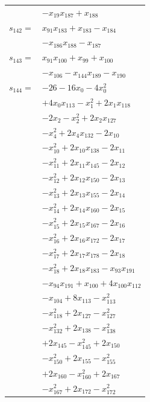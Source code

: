 \begin{longtable}{@{}r@{\;}l@{}}
 & \(\displaystyle -x_{19}x_{187} +x_{188}\) \\[3pt]
\(s_{142}=\) & \(\displaystyle x_{91}x_{183} +x_{183} -x_{184}\) \\
 & \(\displaystyle -x_{186}x_{188} -x_{187}\) \\[3pt]
\(s_{143}=\) & \(\displaystyle x_{91}x_{100} +x_{99} +x_{100}\) \\
 & \(\displaystyle -x_{106} -x_{144}x_{189} -x_{190}\) \\[3pt]
\(s_{144}=\) & \(\displaystyle -26 -16x_{0} -4x_{0}^{2}\) \\
 & \(\displaystyle +4x_{0}x_{113} -x_{1}^{2} +2x_{1}x_{118}\) \\
 & \(\displaystyle -2x_{2} -x_{2}^{2} +2x_{2}x_{127}\) \\
 & \(\displaystyle -x_{4}^{2} +2x_{4}x_{132} -2x_{10}\) \\
 & \(\displaystyle -x_{10}^{2} +2x_{10}x_{138} -2x_{11}\) \\
 & \(\displaystyle -x_{11}^{2} +2x_{11}x_{145} -2x_{12}\) \\
 & \(\displaystyle -x_{12}^{2} +2x_{12}x_{150} -2x_{13}\) \\
 & \(\displaystyle -x_{13}^{2} +2x_{13}x_{155} -2x_{14}\) \\
 & \(\displaystyle -x_{14}^{2} +2x_{14}x_{160} -2x_{15}\) \\
 & \(\displaystyle -x_{15}^{2} +2x_{15}x_{167} -2x_{16}\) \\
 & \(\displaystyle -x_{16}^{2} +2x_{16}x_{172} -2x_{17}\) \\
 & \(\displaystyle -x_{17}^{2} +2x_{17}x_{178} -2x_{18}\) \\
 & \(\displaystyle -x_{18}^{2} +2x_{18}x_{183} -x_{93}x_{191}\) \\
 & \(\displaystyle -x_{94}x_{191} +x_{100} +4x_{100}x_{112}\) \\
 & \(\displaystyle -x_{104} +8x_{113} -x_{113}^{2}\) \\
 & \(\displaystyle -x_{118}^{2} +2x_{127} -x_{127}^{2}\) \\
 & \(\displaystyle -x_{132}^{2} +2x_{138} -x_{138}^{2}\) \\
 & \(\displaystyle +2x_{145} -x_{145}^{2} +2x_{150}\) \\
 & \(\displaystyle -x_{150}^{2} +2x_{155} -x_{155}^{2}\) \\
 & \(\displaystyle +2x_{160} -x_{160}^{2} +2x_{167}\) \\
 & \(\displaystyle -x_{167}^{2} +2x_{172} -x_{172}^{2}\) \\

\end{longtable}
